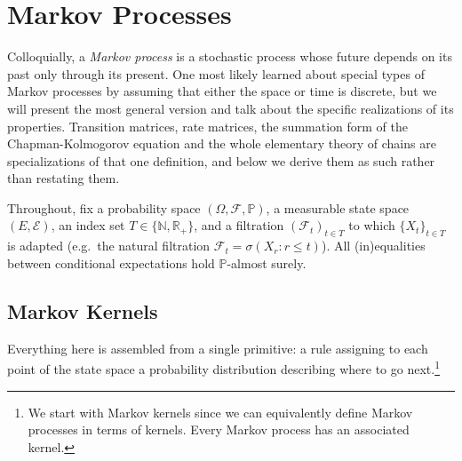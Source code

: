 \section{Markov Processes}

	Colloquially, a \textit{Markov process} is a stochastic process whose future depends on its past only through its present. One most likely learned about special types of Markov processes by assuming that either the space or time is discrete, but we will present the most general version and talk about the specific realizations of its properties. Transition matrices, rate matrices, the summation form of the Chapman-Kolmogorov equation and the whole elementary theory of chains are specializations of that one definition, and below we derive them as such rather than restating them.

	Throughout, fix a probability space $(\Omega, \mathcal{F}, \mathbb{P})$, a measurable state space $(E, \mathcal{E})$, an index set $T \in \{\mathbb{N}, \mathbb{R}_+\}$, and a filtration $(\mathcal{F}_t)_{t \in T}$ to which $\{X_t\}_{t \in T}$ is adapted (e.g.\ the natural filtration $\mathcal{F}_t = \sigma(X_r : r \leq t)$). All (in)equalities between conditional expectations hold $\mathbb{P}$-almost surely.

\subsection{Markov Kernels} 

	Everything here is assembled from a single primitive: a rule assigning to each point of the state space a probability distribution describing where to go next.\footnote{We start with Markov kernels since we can equivalently define Markov processes in terms of kernels. Every Markov process has an associated kernel.}
	
